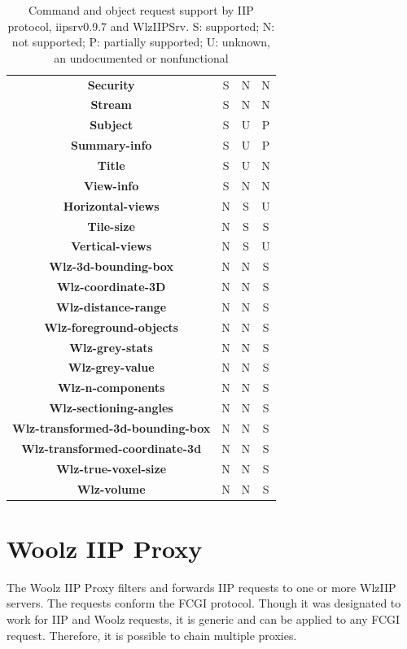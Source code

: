 \documentclass[11pt]{article}
\newcommand{\com}[1]{\textbf{#1}}
\begin{document}
\begin{table}[!hp]
{\begin{tabular}{|c|c|c|c|}
\com{Security}          & S & N & N \\
\com{Stream}            & S & N & N \\
\com{Subject}           & S & U & P \\
\com{Summary-info}      & S & U & P \\
\com{Title}             & S & U & N \\
\com{View-info}         & S & N & N \\
\hline
\com{Horizontal-views}      & N & S & U \\
\com{Tile-size}             & N & S & S \\
\com{Vertical-views}        & N & S & U \\
\hline
\com{Wlz-3d-bounding-box}   & N & N & S \\
\com{Wlz-coordinate-3D}     & N & N & S \\
\com{Wlz-distance-range}    & N & N & S \\
\com{Wlz-foreground-objects}& N & N & S \\
\com{Wlz-grey-stats}        & N & N & S \\
\com{Wlz-grey-value}        & N & N & S \\
\com{Wlz-n-components}      & N & N & S \\
\com{Wlz-sectioning-angles} & N & N & S \\
\com{Wlz-transformed-3d-bounding-box}   & N & N & S \\
\com{Wlz-transformed-coordinate-3d}        & N & N & S \\
\com{Wlz-true-voxel-size}   & N & N & S \\
\com{Wlz-volume}            & N & N & S \\
\hline
\end{tabular}
}
\caption{Command and object request support by IIP protocol,
         iipsrv0.9.7 and WlzIIPSrv. S: supported; N: not supported;
	 P: partially supported; U: unknown, an undocumented or
	 nonfunctional}
\label{tab:comparision}
\end{table}

\section{Woolz IIP Proxy}

The Woolz IIP Proxy filters and forwards IIP requests to one or more
WlzIIP servers. The requests conform the FCGI protocol. Though it was
designated to work for IIP and Woolz requests, it is generic and can
be applied to any FCGI request. Therefore, it is possible to chain
multiple proxies.
\end{document}
